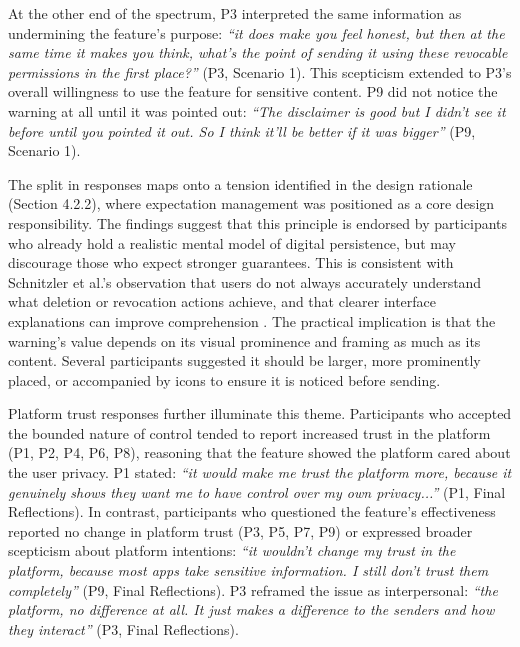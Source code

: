 At the other end of the spectrum, P3 interpreted the same information as undermining the feature's purpose: \textit{``it does make you feel honest, but then at the same time it makes you think, what's the point of sending it using these revocable permissions in the first place?''} (P3, Scenario 1). This scepticism extended to P3's overall willingness to use the feature for sensitive content. P9 did not notice the warning at all until it was pointed out: \textit{``The disclaimer is good but I didn't see it before until you pointed it out. So I think it'll be better if it was bigger''} (P9, Scenario 1).
 
The split in responses maps onto a tension identified in the design rationale (Section 4.2.2), where expectation management was positioned as a core design responsibility. The findings suggest that this principle is endorsed by participants who already hold a realistic mental model of digital persistence, but may discourage those who expect stronger guarantees. This is consistent with Schnitzler et al.'s observation that users do not always accurately understand what deletion or revocation actions achieve, and that clearer interface explanations can improve comprehension \cite{schnitzler_2020}. The practical implication is that the warning's value depends on its visual prominence and framing as much as its content. Several participants suggested it should be larger, more prominently placed, or accompanied by icons to ensure it is noticed before sending.
 
Platform trust responses further illuminate this theme. Participants who accepted the bounded nature of control tended to report increased trust in the platform (P1, P2, P4, P6, P8), reasoning that the feature showed the platform cared about the user privacy. P1 stated: \textit{``it would make me trust the platform more, because it genuinely shows they want me to have control over my own privacy...''} (P1, Final Reflections). In contrast, participants who questioned the feature's effectiveness reported no change in platform trust (P3, P5, P7, P9) or expressed broader scepticism about platform intentions: \textit{``it wouldn't change my trust in the platform, because most apps take sensitive information. I still don't trust them completely''} (P9, Final Reflections). P3 reframed the issue as interpersonal: \textit{``the platform, no difference at all. It just makes a difference to the senders and how they interact''} (P3, Final Reflections).
 

